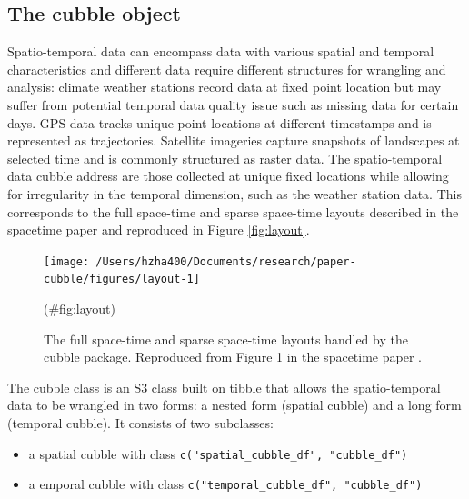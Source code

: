\documentclass[
]{jss}
\providecommand{\tightlist}{%
  \setlength{\itemsep}{0pt}\setlength{\parskip}{0pt}}
\begin{document}
\hypertarget{object}{%
\subsection{The cubble object}\label{object}}

Spatio-temporal data can encompass data with various spatial and
temporal characteristics and different data require different structures
for wrangling and analysis: climate weather stations record data at
fixed point location but may suffer from potential temporal data quality
issue such as missing data for certain days. GPS data tracks unique
point locations at different timestamps and is represented as
trajectories. Satellite imageries capture snapshots of landscapes at
selected time and is commonly structured as raster data. The
spatio-temporal data cubble address are those collected at unique fixed
locations while allowing for irregularity in the temporal dimension,
such as the weather station data. This corresponds to the full
space-time and sparse space-time layouts described in the spacetime
paper \citep{spacetime} and reproduced in Figure \ref{fig:layout}.

\begin{CodeChunk}
\begin{figure}

{\centering \texttt{[image: /Users/hzha400/Documents/research/paper-cubble/figures/layout-1]} 

}

\caption[The full space-time and sparse space-time layouts handled by the cubble package]{The full space-time and sparse space-time layouts handled by the cubble package. Reproduced from Figure 1 in the spacetime paper \citep{spacetime}.}(\#fig:layout)
\end{figure}
\end{CodeChunk}

The cubble class is an S3 class built on tibble that allows the
spatio-temporal data to be wrangled in two forms: a nested form (spatial
cubble) and a long form (temporal cubble). It consists of two
subclasses:

\begin{itemize}
\tightlist
\item
  a spatial cubble with class
  \texttt{c("spatial\_cubble\_df",\ "cubble\_df")}
\item
  a emporal cubble with class
  \texttt{c("temporal\_cubble\_df",\ "cubble\_df")}
\end{itemize}
\end{document}
